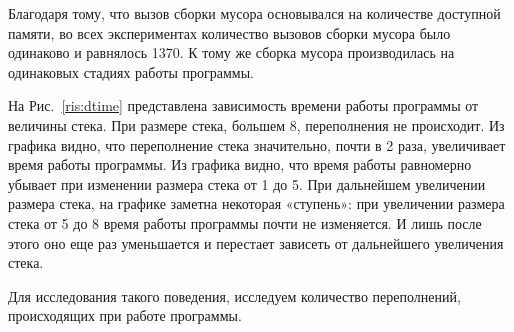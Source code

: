 Благодаря тому, что вызов сборки мусора основывался на количестве доступной памяти, во всех экспериментах количество вызовов сборки мусора было одинаково и равнялось 
1370. К тому же сборка мусора производилась на одинаковых стадиях работы программы.

На Рис.~\ref{ris:dtime} представлена зависимость времени работы программы от
величины стека. При размере стека, большем 8, переполнения не происходит. Из графика видно, что переполнение стека значительно, почти в 2 раза, увеличивает 
время работы программы. Из графика видно, что время работы равномерно убывает при изменении размера стека от 1 до 5. При дальнейшем увеличении размера стека, 
на графике заметна некоторая «ступень»: при увеличении размера стека от 5 до 8 время работы программы почти не изменяется. И лишь после этого оно еще раз уменьшается 
и перестает зависеть от дальнейшего увеличения стека. 

Для исследования такого поведения, исследуем количество переполнений, происходящих при работе программы.

